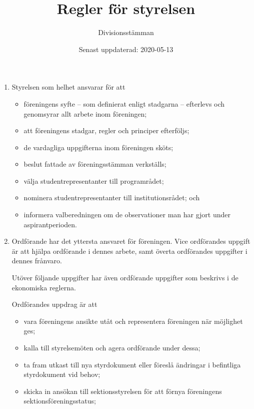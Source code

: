 \documentclass{dvd}
\begin{document}
	\title{Regler för styrelsen}
	\author{Divisionsstämman}
	\date{Senast uppdaterad: 2020-05-13}

	\begin{enumerate}[label=\arabic* §, ref=\arabic*]
		\item Styrelsen som helhet ansvarar för att
		\begin{itemize}
			\item föreningens syfte -- som definierat enligt stadgarna -- efterlevs och genomsyrar allt arbete inom föreningen;

			\item att föreningens stadgar, regler och principer efterföljs;

			\item de vardagliga uppgifterna inom föreningen sköts;

			\item beslut fattade av föreningsstämman verkställs;

			\item välja studentrepresentanter till programrådet;

			\item nominera studentrepresentanter till institutionsrådet; och

			\item informera valberedningen om de observationer man har gjort under aspirantperioden.
		\end{itemize}

		\item Ordförande har det yttersta ansvaret för föreningen.
		Vice ordförandes uppgift är att hjälpa ordförande i dennes arbete, samt överta ordförandes uppgifter i dennes frånvaro.

		Utöver följande uppgifter har även ordförande uppgifter som beskrivs i de ekonomiska reglerna.

		Ordförandes uppdrag är att
		\begin{itemize}
		\item vara föreningens ansikte utåt och representera föreningen när möjlighet ges;

		\item kalla till styrelsemöten och agera ordförande under dessa;

		\item ta fram utkast till nya styrdokument eller föreslå ändringar i befintliga styrdokument vid behov;

		\item skicka in ansökan till sektionsstyrelsen för att förnya föreningens sektionsföreningsstatus;


\end{itemize}
\end{enumerate}
\end{document}

